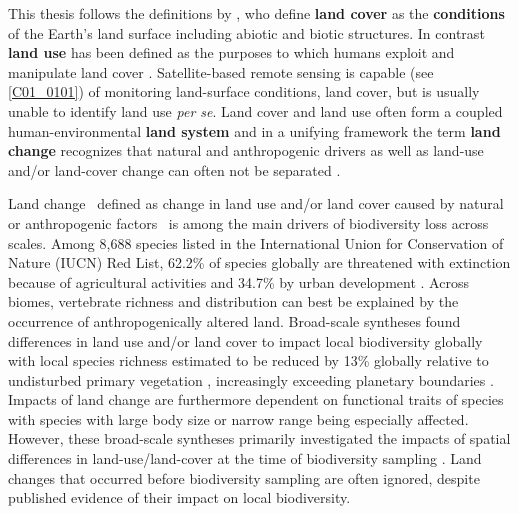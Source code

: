   \vspace{-20pt}
  \begin{center}
        \begin{definitions}[Definitions]
        This thesis follows the definitions by \cite{Lambin2006}, who define \textbf{land cover} as the \textbf{conditions} of the Earth’s land surface including abiotic and biotic structures. In contrast \textbf{land use} has been defined as the purposes to which humans exploit and manipulate land cover \citep{Lambin2006}. Satellite-based remote sensing is capable (see \ref{C01_0101}) of monitoring land-surface conditions, \ie land cover, but is usually unable to identify land use \textit{per se}. Land cover and land use often form a coupled human-environmental \textbf{land system} \citep{Lambin2006,Turner2007} and in a unifying framework the term \textbf{land change} recognizes that natural and anthropogenic drivers as well as land-use and/or land-cover change can often not be separated \citep{Turner2007,Lambin2006}.
        \end{definitions}  
  \end{center}
  \vspace{-20pt}

Land change \textendash\ defined as change in land use and/or land cover caused by natural or anthropogenic factors \citep[Box 1.1, ][]{Lambin2003,Turner2007,Song2018} \textendash\ is among the main drivers of biodiversity loss across scales. Among 8,688 species listed in the International Union for Conservation of Nature (IUCN) Red List, 62.2\% of species globally are threatened with extinction because of agricultural activities and 34.7\% by urban development \citep{Maxwell2016}. Across biomes, vertebrate richness \citep{Brum2013,Kehoe2017} and distribution \citep{DiMarco2015} can best be explained by the occurrence of anthropogenically altered land. Broad-scale syntheses found differences in land use and/or land cover to impact local biodiversity globally \citep{Gibson2011,Murphy2014,Newbold2014b,Newbold2015,Alroy2017} with local species richness estimated to be reduced by 13\% globally relative to undisturbed primary vegetation \citep{Newbold2015}, increasingly exceeding planetary boundaries \citep{Newbold2016a}. Impacts of land change are furthermore dependent on functional traits of species \citep{Newbold2013,Jung2016} with species with large body size \citep{Newbold2013,Newbold2015} or narrow range \citep{Newbold2018} being especially affected. However, these broad-scale syntheses primarily investigated the impacts of spatial differences in land-use/land-cover at the time of biodiversity sampling \citep{Gibson2011,Murphy2014,Newbold2015,Alroy2017}. Land changes that occurred before biodiversity sampling are often ignored, despite published evidence of their impact on local biodiversity.

